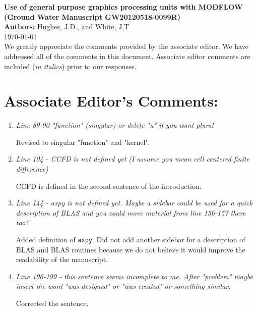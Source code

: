 \documentclass[12pt]{article} %
\begin{document}
\noindent
\textbf{Use of general purpose graphics processing units with MODFLOW \\ (Ground Water Manuscript GW20120518-0099R) }\\

\noindent
\textbf{Authors:} Hughes, J.D., and White, J.T \\

\today \\

\noindent
We greatly appreciate the comments provided by the associate editor. We have addressed all of the comments in this document. Associate editor comments are included (\textit{in italics}) prior to our responses. 

\section*{Associate Editor's Comments:}
\begin{enumerate}
\item \textit{Line 89-90 "function" (singular) or delete "a" if you want plural}

Revised to singular "function" and "kernel".

\item \textit{Line 104 - CCFD is not defined yet (I assume you mean cell centered finite difference)}

CCFD is defined in the second sentence of the introduction.

\item \textit{Line 144 - axpy is not defined yet. Maybe a sidebar could be used for a quick description of BLAS and you could move material from line 156-157 there too?} 

Added definition of \texttt{axpy}. Did not add another sidebar for a description of BLAS and BLAS routines because we do not believe it would improve the readability of the manuscript.

\item \textit{Line 196-199 - this sentence seems incomplete to me. After "problem" maybe insert the word "was designed" or "was created" or something similar.}

Corrected the sentence.

\end{enumerate}
\end{document}

